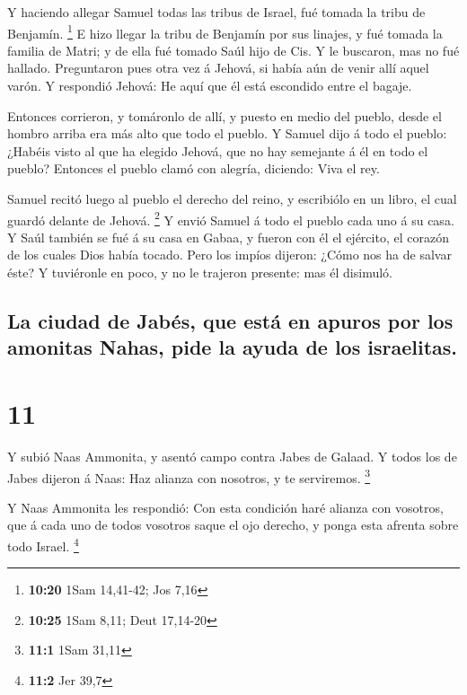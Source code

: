  Y haciendo allegar Samuel todas las tribus de Israel,
fué tomada la tribu de Benjamín. \footnote{\textbf{10:20} 1Sam 14,41-42;
  Jos 7,16}  E hizo llegar la tribu de Benjamín por sus
linajes, y fué tomada la familia de Matri; y de ella fué tomado Saúl
hijo de Cis. Y le buscaron, mas no fué hallado. 
Preguntaron pues otra vez á Jehová, si había aún de venir allí aquel
varón. Y respondió Jehová: He aquí que él está escondido entre el
bagaje.

 Entonces corrieron, y tomáronlo de allí, y puesto en
medio del pueblo, desde el hombro arriba era más alto que todo el
pueblo.  Y Samuel dijo á todo el pueblo: ¿Habéis visto al
que ha elegido Jehová, que no hay semejante á él en todo el pueblo?
Entonces el pueblo clamó con alegría, diciendo: Viva el rey.

 Samuel recitó luego al pueblo el derecho del reino, y
escribiólo en un libro, el cual guardó delante de Jehová. \footnote{\textbf{10:25}
  1Sam 8,11; Deut 17,14-20}  Y envió Samuel á todo el
pueblo cada uno á su casa. Y Saúl también se fué á su casa en Gabaa, y
fueron con él el ejército, el corazón de los cuales Dios había tocado.
 Pero los impíos dijeron: ¿Cómo nos ha de salvar éste? Y
tuviéronle en poco, y no le trajeron presente: mas él disimuló.

\hypertarget{la-ciudad-de-jabuxe9s-que-estuxe1-en-apuros-por-los-amonitas-nahas-pide-la-ayuda-de-los-israelitas.}{%
\subsection{La ciudad de Jabés, que está en apuros por los amonitas
Nahas, pide la ayuda de los
israelitas.}\label{la-ciudad-de-jabuxe9s-que-estuxe1-en-apuros-por-los-amonitas-nahas-pide-la-ayuda-de-los-israelitas.}}

\hypertarget{section-10}{%
\section{11}\label{section-10}}

 Y subió Naas Ammonita, y asentó campo contra Jabes de
Galaad. Y todos los de Jabes dijeron á Naas: Haz alianza con nosotros, y
te serviremos. \footnote{\textbf{11:1} 1Sam 31,11}

 Y Naas Ammonita les respondió: Con esta condición haré
alianza con vosotros, que á cada uno de todos vosotros saque el ojo
derecho, y ponga esta afrenta sobre todo Israel. \footnote{\textbf{11:2}
  Jer 39,7}

